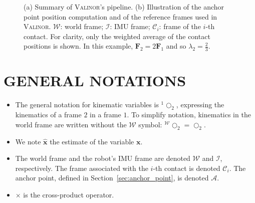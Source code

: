 \documentclass{IJCAS}
\begin{document}
\begin{figure}[]
      \hfill
    \caption{(a) Summary of {\scshape Valinor}'s pipeline. (b) Illustration of the anchor point position computation and of the reference frames used in {\scshape Valinor}. $\mathcal{W}$: world frame; $\mathcal{I}$: IMU frame; $\mathcal{C}_{i}$: frame of the $i$-th contact. For clarity, only the weighted average of the contact positions is shown. In this example, $\boldsymbol{F}_{2} = 2\boldsymbol{F}_{1}$ and so $\lambda_{2} = \frac{2}{3}$.}
\end{figure}


\section{GENERAL NOTATIONS}
\begin{itemize}[leftmargin=0em]
    \item The general notation for kinematic variables is $^{1}\bigcirc_{2}$, expressing the kinematics of a frame $2$ in a frame $1$. To simplify notation, kinematics in the world frame are written without the $\mathcal{W}$ symbol: $^{\mathcal{W}}\bigcirc_{2}=\bigcirc_{2}$.
    \item We note $\hat{\boldsymbol{x}}$ the estimate of the variable $\boldsymbol{x}$.
    \item The world frame and the robot's IMU frame are denoted $\mathcal{W}$ and $\mathcal{I}$, respectively. The frame associated with the $i$-th contact is denoted $\mathcal{C}_{i}$. The anchor point, defined in Section~\ref{sec:anchor_point}, is denoted $\mathcal{A}$. 
    \item $\times$ is the cross-product operator.     
\end{itemize} 
\end{document}
